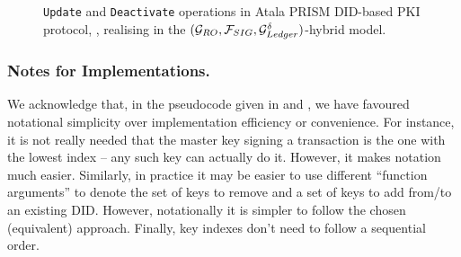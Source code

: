\begin{figure}[ht!]
  \caption{\texttt{Update} and \texttt{Deactivate} operations in Atala
    PRISM DID-based PKI protocol, \RealPKIDIDAtala, realising \IdealGPKIDID
    in the $(\mathcal{G}_{RO},\mathcal{F}_{SIG},\mathcal{G}_{Ledger}^\delta)$-hybrid model.}
  \label{fig:atalapkidid2}
\end{figure}

\subsubsection{Notes for Implementations.} %

We acknowledge that, in the pseudocode given in  and
, we have favoured notational simplicity over
implementation efficiency or
convenience. For instance, it is not really needed that the master key signing a
transaction is the one with the lowest index -- any such key can actually do it.
However, it makes notation much easier. Similarly, in practice it may be easier
to use different ``function arguments'' to denote the set of keys to remove and
a set of keys to add from/to an existing DID. However, notationally it is
simpler to follow the chosen (equivalent) approach. Finally, key indexes don't
need to follow a sequential order.

